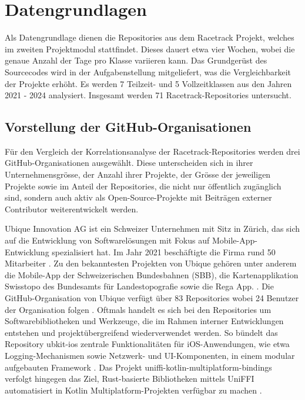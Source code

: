 \section{Datengrundlagen}
\label{sec:Datengrundlagen}
Als Datengrundlage dienen die Repositories aus dem Racetrack Projekt, welches im zweiten Projektmodul stattfindet. Dieses dauert etwa vier Wochen, wobei die genaue Anzahl der Tage pro Klasse variieren kann. Das Grundgerüst des Sourcecodes wird in der Aufgabenstellung mitgeliefert, was die Vergleichbarkeit der Projekte erhöht. Es werden 7 Teilzeit- und 5 Vollzeitklassen aus den Jahren 2021 - 2024 analysiert. Insgesamt werden 71 Racetrack-Repositories untersucht. 

\subsection{Vorstellung der GitHub-Organisationen}
\label{sec:VorstellungGithubOrgs}
Für den Vergleich der Korrelationsanalyse der Racetrack-Repositories werden drei GitHub-Organisationen ausgewählt. Diese unterscheiden sich in ihrer Unternehmensgrösse, der Anzahl ihrer Projekte, der Grösse der jeweiligen Projekte sowie im Anteil der Repositories, die nicht nur öffentlich zugänglich sind, sondern auch aktiv als Open-Source-Projekte mit Beiträgen externer Contributor weiterentwickelt werden.

Ubique Innovation AG ist ein Schweizer Unternehmen mit Sitz in Zürich, das sich auf die Entwicklung von Softwarelösungen mit Fokus auf Mobile-App-Entwicklung spezialisiert hat. Im Jahr 2021 beschäftigte die Firma rund 50 Mitarbeiter \cite{noauthor_mathias_2021}. Zu den bekanntesten Projekten von Ubique gehören unter anderem die Mobile-App der Schweizerischen Bundesbahnen (SBB), die Kartenapplikation Swisstopo des Bundesamts für Landestopografie sowie die Rega App. \parencite{noauthor_apps_nodate}. Die GitHub-Organisation von Ubique verfügt über 83 Repositories wobei 24 Benutzer der Organisation folgen \parencite{noauthor_ubique_nodate}. Oftmals handelt es sich bei den Repositories um Softwarebibliotheken und Werkzeuge, die im Rahmen interner Entwicklungen entstehen und projektübergreifend wiederverwendet werden. So bündelt das Repository ubkit-ios zentrale Funktionalitäten für iOS-Anwendungen, wie etwa Logging-Mechanismen sowie Netzwerk- und UI-Komponenten, in einem modular aufgebauten Framework \parencite{noauthor_ubiqueinnovationubkit-ios_2025}. Das Projekt uniffi-kotlin-multiplatform-bindings verfolgt hingegen das Ziel, Rust-basierte Bibliotheken mittels UniFFI automatisiert in Kotlin Multiplatform-Projekten verfügbar zu machen \parencite{noauthor_ubiqueinnovationuniffi-kotlin-multiplatform-bindings_nodate}.


